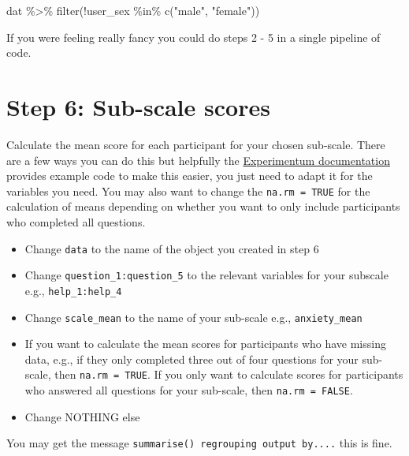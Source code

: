 \documentclass[
  oneside]{book}
\newenvironment{Shaded}{\begin{snugshade}}{\end{snugshade}}
\newcommand{\FunctionTok}[1]{\textcolor[rgb]{0.00,0.00,0.00}{#1}}
\newcommand{\NormalTok}[1]{#1}
\newcommand{\SpecialCharTok}[1]{\textcolor[rgb]{0.00,0.00,0.00}{#1}}
\newcommand{\StringTok}[1]{\textcolor[rgb]{0.31,0.60,0.02}{#1}}
\providecommand{\tightlist}{%
  \setlength{\itemsep}{0pt}\setlength{\parskip}{0pt}}
\begin{document}
\begin{Shaded}
\begin{Highlighting}[]
\NormalTok{dat }\SpecialCharTok{\%\textgreater{}\%}
  \FunctionTok{filter}\NormalTok{(}\SpecialCharTok{!}\NormalTok{user\_sex }\SpecialCharTok{\%in\%} \FunctionTok{c}\NormalTok{(}\StringTok{"male"}\NormalTok{, }\StringTok{"female"}\NormalTok{))}
\end{Highlighting}
\end{Shaded}

If you were feeling really fancy you could do steps 2 - 5 in a single pipeline of code.

\hypertarget{step-6-sub-scale-scores}{%
\section{Step 6: Sub-scale scores}\label{step-6-sub-scale-scores}}

Calculate the mean score for each participant for your chosen sub-scale. There are a few ways you can do this but helpfully the \href{https://gla-my.sharepoint.com/:w:/g/personal/2087153l_student_gla_ac_uk/EfFPtssPMV9HkrZALfdln8wBBJKClQ0eAXzrrHxa0nOo7g?e=SNIhSt}{Experimentum documentation} provides example code to make this easier, you just need to adapt it for the variables you need. You may also want to change the \texttt{na.rm\ =\ TRUE} for the calculation of means depending on whether you want to only include participants who completed all questions.

\begin{itemize}
\tightlist
\item
  Change \texttt{data} to the name of the object you created in step 6
\item
  Change \texttt{question\_1:question\_5} to the relevant variables for your subscale e.g., \texttt{help\_1:help\_4}
\item
  Change \texttt{scale\_mean} to the name of your sub-scale e.g., \texttt{anxiety\_mean}
\item
  If you want to calculate the mean scores for participants who have missing data, e.g., if they only completed three out of four questions for your sub-scale, then \texttt{na.rm\ =\ TRUE}. If you only want to calculate scores for participants who answered all questions for your sub-scale, then \texttt{na.rm\ =\ FALSE}.
\item
  Change NOTHING else
\end{itemize}

You may get the message \texttt{summarise()\ regrouping\ output\ by....} this is fine.
\end{document}
